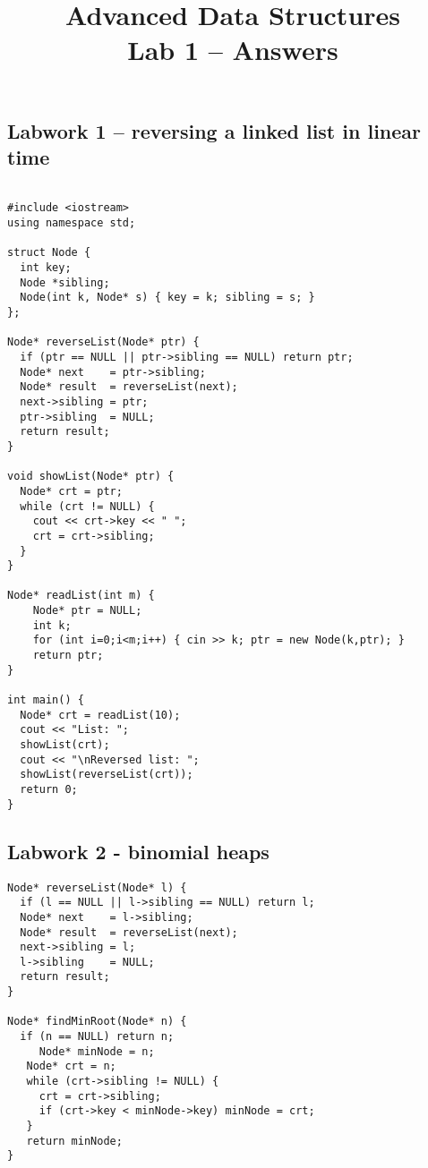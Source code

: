 \documentclass{article}
\title{{\small\sc Advanced Data Structures}\\
Lab 1 -- Answers}
\date{}
\begin{document}
\maketitle
\subsection*{Labwork 1 -- reversing a linked list in linear time}
\begin{verbatim}

#include <iostream>
using namespace std;

struct Node {
  int key;
  Node *sibling;
  Node(int k, Node* s) { key = k; sibling = s; }
};

Node* reverseList(Node* ptr) {
  if (ptr == NULL || ptr->sibling == NULL) return ptr;
  Node* next    = ptr->sibling;
  Node* result  = reverseList(next);
  next->sibling = ptr;
  ptr->sibling  = NULL;
  return result;
}

void showList(Node* ptr) {
  Node* crt = ptr;
  while (crt != NULL) {
    cout << crt->key << " ";
    crt = crt->sibling;
  }
}

Node* readList(int m) {
    Node* ptr = NULL;
    int k;
    for (int i=0;i<m;i++) { cin >> k; ptr = new Node(k,ptr); }
    return ptr;
}

int main() {
  Node* crt = readList(10);
  cout << "List: ";
  showList(crt);
  cout << "\nReversed list: ";
  showList(reverseList(crt));
  return 0;
}
\end{verbatim}

\subsection*{Labwork 2 - binomial heaps}
\begin{verbatim}
Node* reverseList(Node* l) {
  if (l == NULL || l->sibling == NULL) return l;
  Node* next    = l->sibling;
  Node* result  = reverseList(next);
  next->sibling = l;
  l->sibling    = NULL;
  return result;
}

Node* findMinRoot(Node* n) {
  if (n == NULL) return n;
     Node* minNode = n;
   Node* crt = n;
   while (crt->sibling != NULL) {
     crt = crt->sibling;
     if (crt->key < minNode->key) minNode = crt;
   }
   return minNode;
}
\end{verbatim}
\end{document}
